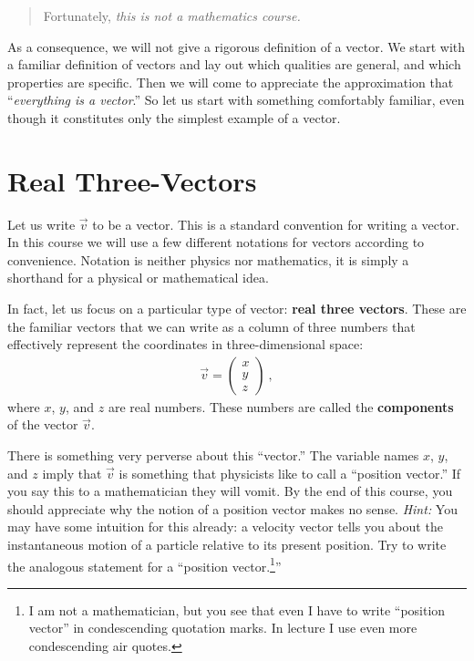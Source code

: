 \begin{quote}
Fortunately, \emph{this is not a mathematics course.}
\end{quote}

As a consequence, we will not give a rigorous definition of a vector. We start with a familiar definition of vectors and lay out which qualities are general, and which properties are specific. Then we will come to appreciate the approximation that ``\emph{everything is a vector}.'' So let us start with something comfortably familiar, even though it constitutes only the simplest example of a vector.


\section{Real Three-Vectors}

Let us write $\vec{v}$ to be a vector. This is a standard convention for writing a vector. In this course we will use a few different notations for vectors according to convenience. Notation is neither physics nor mathematics, it is simply a shorthand for a physical or mathematical idea. 

In fact, let us focus on a particular type of vector: \textbf{real three vectors}. These are the familiar vectors that we can write as a column of three numbers that effectively represent the coordinates in three-dimensional space:
\begin{align}
    \vec{v} = 
    \begin{pmatrix}
        x\\ y\\ z
    \end{pmatrix} \ ,
\end{align}
where $x$, $y$, and $z$ are real numbers. These numbers are called the \textbf{components} of the vector $\vec{v}$.

\begin{exercise}
There is something very perverse about this ``vector.'' The variable names $x$, $y$, and $z$ imply that $\vec{v}$ is something that physicists like to call a ``position vector.'' If you say this to a mathematician they will vomit. By the end of this course, you should appreciate why the notion of a position vector makes no sense. \emph{Hint:} You may have some intuition for this already: a velocity vector tells you about the instantaneous motion of a particle relative to its present position. Try to write the analogous statement for a ``position vector.\footnote{I am not a mathematician, but you see that even I have to write ``position vector'' in condescending quotation marks. In lecture I use even more condescending air quotes.}''
\label{ex:position:vector}
\end{exercise}


